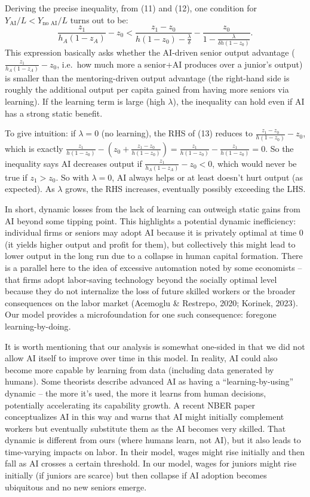 \documentclass[12pt]{article}
\begin{document}
Deriving the precise inequality, from (11) and (12), one condition for
\(Y_{\text{AI}}/L < Y_{\text{no AI}}/L\) turns out to be:
\begin{equation}
\frac{z_1}{h_A(1-z_A)} - z_0 <
\frac{z_1 - z_0}{h(1-z_0) - \frac{\lambda}{\delta}} -
\frac{z_0}{1 - \frac{\lambda}{\delta h(1-z_0)}}. \tag{13}
\end{equation}
This
expression basically asks whether the {AI-driven senior output
advantage} (\(\frac{z_1}{h_A(1-z_A)} - z_0\), i.e.~how much more a
senior+AI produces over a junior's output) is smaller than the
{mentoring-driven output advantage} (the right-hand side is
roughly the additional output per capita gained from having more seniors
via learning). If the learning term is large (high \(\lambda\)), the
inequality can hold even if AI has a strong static benefit.

To give intuition: if \(\lambda = 0\) (no learning), the RHS of (13)
reduces to \(\frac{z_1 - z_0}{h(1-z_0)} - z_0\), which is exactly $
\frac{z_1}{h(1-z_0)} - (z_0 + \frac{z_1 - z_0}{h(1-z_0)}) =
\frac{z_1}{h(1-z_0)} - \frac{z_1}{h(1-z_0)} = 0$. So the inequality
says AI decreases output if $ \frac{z_1}{h_A(1-z_A)} - z_0 <{}
0$, which would {never} be true if \(z_1 > z_0\). So with
\(\lambda=0\), AI always helps or at least doesn't hurt output (as
expected). As \(\lambda\) grows, the RHS increases, eventually possibly
exceeding the LHS.

In short, {dynamic losses from the lack of learning can outweigh
static gains from AI} beyond some tipping point. This highlights a
potential {dynamic inefficiency}: individual firms or seniors may
adopt AI because it is privately optimal at time 0 (it yields higher
output and profit for them), but collectively this might lead to lower
output in the long run due to a collapse in human capital formation.
There is a parallel here to the idea of {excessive automation}
noted by some economists -- that firms adopt labor-saving technology
beyond the socially optimal level because they do not internalize the
loss of future skilled workers or the broader consequences on the labor
market (Acemoglu \& Restrepo, 2020; Korinek, 2023). Our model provides a
microfoundation for one such consequence: {foregone
learning-by-doing}.

It is worth mentioning that our analysis is somewhat one-sided in that
{we did not allow AI itself to improve} over time in this model.
In reality, AI could also become more capable by learning from data
(including data generated by humans). Some theorists describe advanced
AI as having a ``learning-by-using'' dynamic -- the more it's used, the
more it learns from human decisions, potentially {accelerating} its
capability growth. A recent NBER paper conceptualizes AI in this way and
warns that AI might initially complement workers but eventually
substitute them as the AI becomes very skilled. That dynamic is
different from ours (where humans learn, not AI), but it also leads to
time-varying impacts on labor. In their model, wages might rise
initially and then fall as AI crosses a certain threshold. In our model,
wages for juniors might rise initially (if juniors are scarce) but then
collapse if AI adoption becomes ubiquitous and no new seniors emerge.
\end{document}
